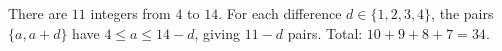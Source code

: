 There are $11$ integers from $4$ to $14$. For each difference $d\in\{1,2,3,4\}$, the pairs $\{a,a+d\}$ have $4\le a\le14-d$, giving $11-d$ pairs. Total: $10+9+8+7=\boxed{34}$.
